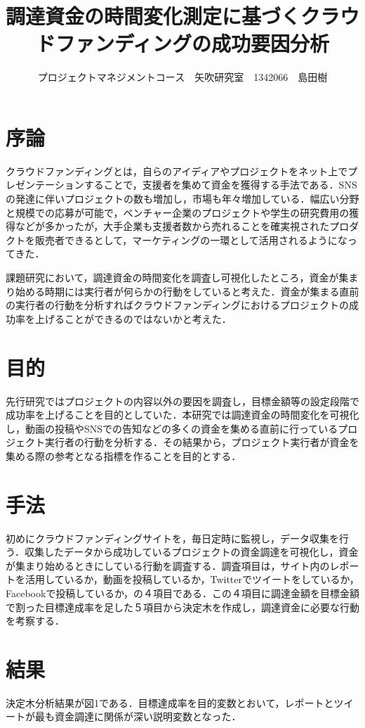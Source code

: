 \documentclass[uplatex,twocolumn,dvipdfmx]{jsarticle}
\title{\vspace{-5mm}\fontsize{14pt}{0pt}\selectfont 調達資金の時間変化測定に基づくクラウドファンディングの成功要因分析}
\author{\normalsize プロジェクトマネジメントコース　矢吹研究室　1342066　島田樹}
\date{}
\begin{document}
\fontsize{10.5pt}{\baselineskip}\selectfont
\maketitle





\section{序論}
クラウドファンディング\cite{wiki}とは，自らのアイディアやプロジェクトをネット上でプレゼンテーションすることで，支援者を集めて資金を獲得する手法である．SNSの発達に伴いプロジェクトの数も増加し，市場も年々増加している\cite{visualizing}．幅広い分野と規模での応募が可能で，ベンチャー企業のプロジェクトや学生の研究費用の獲得などが多かったが，大手企業も支援者数から売れることを確実視されたプロダクトを販売者できるとして，マーケティングの一環として活用されるようになってきた．

課題研究において，調達資金の時間変化を調査し可視化したところ，資金が集まり始める時期には実行者が何らかの行動をしていると考えた．資金が集まる直前の実行者の行動を分析すればクラウドファンディングにおけるプロジェクトの成功率を上げることができるのではないかと考えた．


\section{目的}
先行研究ではプロジェクトの内容以外の要因を調査し，目標金額等の設定段階で成功率を上げることを目的としていた．本研究では調達資金の時間変化を可視化し，動画の投稿やSNSでの告知などの多くの資金を集める直前に行っているプロジェクト実行者の行動を分析する．その結果から，プロジェクト実行者が資金を集める際の参考となる指標を作ることを目的とする．


\section{手法}
初めにクラウドファンディングサイトを，毎日定時に監視し，データ収集を行う．収集したデータから成功しているプロジェクトの資金調達を可視化し，資金が集まり始めるときにしている行動を調査する．調査項目は，サイト内のレポートを活用しているか，動画を投稿しているか，Twitterでツイートをしているか，Facebookで投稿しているか，の４項目である．この４項目に調達金額を目標金額で割った目標達成率を足した５項目から決定木を作成し，調達資金に必要な行動を考察する．


\section{結果}
決定木分析結果が図1である．目標達成率を目的変数とおいて，レポートとツイートが最も資金調達に関係が深い説明変数となった．
\end{document}
